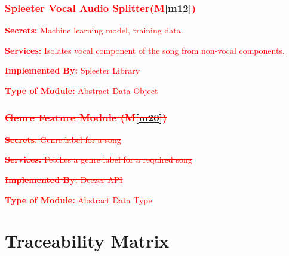 \documentclass[12pt, titlepage]{article}
\newcommand{\mref}[1]{M\ref{#1}}
\begin{document}
\subsubsection{\textcolor{red}{Spleeter Vocal Audio Splitter(\mref{m12})}}

\begin{description}
\item \textcolor{red}{\textbf{Secrets:} Machine learning model, training data.}
\item \textcolor{red}{\textbf{Services:} Isolates vocal component of the song from non-vocal components.}
\item \textcolor{red}{\textbf{Implemented By:} Spleeter Library}
\item \textcolor{red}{\textbf{Type of Module:} Abstract Data Object}
\end{description}



\subsubsection*{\textcolor{red}{\sout{Genre Feature Module (\mref{m20})}}}

\begin{description}
\item \textcolor{red}{\sout{\textbf{Secrets:} Genre label for a song}}
\item \textcolor{red}{\sout{\textbf{Services:} Fetches a genre label for a required song}}
\item \textcolor{red}{\sout{\textbf{Implemented By:} Deezer API}}
\item \textcolor{red}{\sout{\textbf{Type of Module:} Abstract Data Type}}
\end{description}

\section{Traceability Matrix} \label{SecTM}
\end{document}
